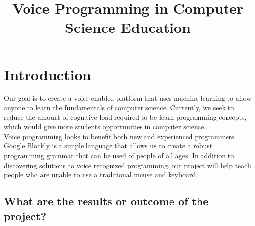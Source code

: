\documentclass[]{article}
\title{Voice Programming in Computer Science Education}
\begin{document}
\maketitle

\section{Introduction}


Our goal is to create a voice enabled platform that uses machine learning to allow 
anyone to learn the fundamentals of computer science. Currently, we seek to reduce the amount
of cognitive load required to be learn programming concepts, which would give more 
students opportunities in computer science. 
\\ 
Voice programming looks to benefit both new and experienced programmers.  
Google Blockly is a simple language that allows us to create a robust programming grammar 
that can be used of people of all ages. In addition to discovering solutions to voice 
recognized programming, our project will help teach people who are unable to use a traditional mouse and keyboard.

\subsection{What are the results or outcome of the project?}
\end{document}
